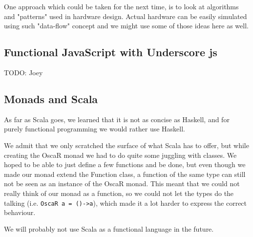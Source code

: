\documentclass[a4paper]{article}
\begin{document}
One approach which could
be taken for the next time, is to look at algorithms and "patterns" used in hardware
design. Actual hardware can be easily simulated using such "data-flow" concept
and we might use some of those ideas here as well.

\subsection{Functional JavaScript with Underscore js}
{\Large TODO:} Joey

\subsection{Monads and Scala}
As far as Scala goes, 
we learned that it is not as concise as Haskell,
and for purely functional programming we would rather use Haskell.

We admit that we only scratched the surface of what Scala has to offer,
but while creating the OscaR monad we had to do quite some juggling with classes.
We hoped to be able to just define a few functions and be done, 
but even though we made our monad extend the Function class,
a function of the same type can still not be seen as an instance of the OscaR monad.
This meant that we could not really think of our monad as a function,
so we could not let the types do the talking (i.e. \verb|OscaR a = ()->a|),
which made it a lot harder to express the correct behaviour.

We will probably not use Scala as a functional language in the future.

\printbibliography
\end{document}
